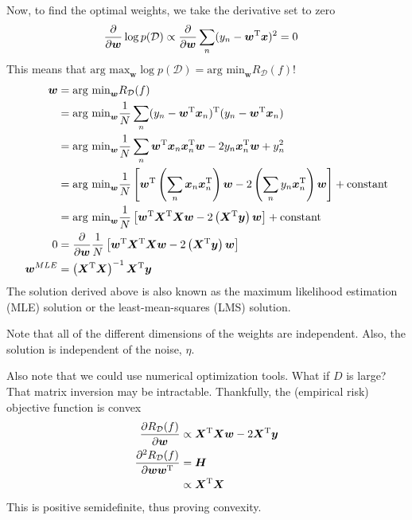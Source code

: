 \documentclass[11pt]{article}
\newcommand{\vct}[1]{\boldsymbol{#1}} %
\newcommand{\mat}[1]{\boldsymbol{#1}} %
\newcommand{\T}{^{\textrm T}} %
\begin{document}
Now, to find the optimal weights, we take the derivative set to zero
\begin{align*}
\frac{\partial}{\partial \vct{w}} \log p(\mathcal{D}) &\propto \frac{\partial}{\partial \vct{w}} \sum_n (y_n - \vct{w}\T\vct{x})^2 = 0
\end{align*}
This means that $\text{arg max}_{\vct{w}} \log p(\mathcal{D}) = \text{arg min}_{\vct{w}} R_{\mathcal{D}}(f)$!
\begin{align*}
\vct{w} &= \text{arg min}_{\vct{w}} R_{\mathcal{D}}(f)\\
&= \text{arg min}_{\vct{w}} \frac{1}{N} \sum_n (y_n - \vct{w}\T\vct{x}_n)\T(y_n - \vct{w}\T\vct{x}_n)\\
&= \text{arg min}_{\vct{w}} \frac{1}{N} \sum_n \vct{w}\T\vct{x}_n\vct{x}_n\T\vct{w} - 2y_n\vct{x}_n\T\vct{w} + y_n^2\\
&= \text{arg min}_{\vct{w}} \frac{1}{N} \left[ \vct{w}\T \left(\sum_n \vct{x}_n\vct{x}_n\T\right)\vct{w} - 2\left(\sum_n y_n\vct{x}_n\T\right)\vct{w} \right]+\text{constant}\\
&= \text{arg min}_{\vct{w}} \frac{1}{N} \left[ \vct{w}\T \mat{X}\T\mat{X}\vct{w} - 2\left(\mat{X}\T\vct{y}\right)\vct{w} \right]+\text{constant}\\
0 &= \frac{\partial}{\partial \vct{w}} \frac{1}{N} \left[ \vct{w}\T \mat{X}\T\mat{X}\vct{w} - 2\left(\mat{X}\T\vct{y}\right)\vct{w} \right]\\
\vct{w}^{MLE} &= \left(\mat{X}\T\mat{X}\right)^{-1}\mat{X}\T\vct{y} 
\end{align*}
The solution derived above is also known as the maximum likelihood estimation (MLE) solution or the least-mean-squares (LMS) solution.

Note that all of the different dimensions of the weights are independent. Also, the solution is independent of the noise, $\eta$.

Also note that we could use numerical optimization tools. What if $D$ is large? That matrix inversion may be intractable. Thankfully, the (empirical risk) objective function is convex
\begin{align*}
\frac{\partial R_{\mathcal{D}}(f)}{\partial \vct{w}} &\propto \mat{X}\T\mat{X}\vct{w} - 2\mat{X}\T\vct{y}\\
\frac{\partial^2 R_{\mathcal{D}}(f)}{\partial \vct{w}\vct{w}\T} &= \mat{H}\\
&\propto \mat{X}\T\mat{X}
\end{align*}
This is positive semidefinite, thus proving convexity.
\end{document}
